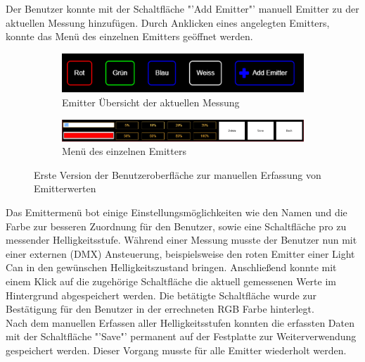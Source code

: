 \documentclass[11pt]{scrartcl}
\begin{document}
Der Benutzer konnte mit der Schaltfläche "'Add Emitter"' manuell Emitter zu der aktuellen Messung hinzufügen. Durch Anklicken eines angelegten
Emitters, konnte das Menü des einzelnen Emitters geöffnet werden.
\begin{figure}[H]
    \centering
    \begin{subfigure}[b]{\textwidth}
        \includegraphics[width=\textwidth]{images/app_emitters_v1.png}
        \caption{Emitter Übersicht der aktuellen Messung}
    \end{subfigure}
    \hfill 
    \begin{subfigure}[b]{\textwidth}
        \includegraphics[width=\textwidth]{images/app_edit_emitters_v1.png}
        \caption{Menü des einzelnen Emitters}
    \end{subfigure}
    \caption{Erste Version der Benutzeroberfläche zur manuellen Erfassung von Emitterwerten}
\end{figure}
\noindent
Das Emittermenü bot einige Einstellungsmöglichkeiten wie den Namen und die Farbe zur besseren Zuordnung für den Benutzer, sowie eine Schaltfläche pro zu messender
Helligkeitsstufe. Während einer Messung musste der Benutzer nun mit einer externen (DMX) Ansteuerung, beispielsweise den roten
Emitter einer Light Can in den gewünschen Helligkeitszustand bringen. Anschließend konnte mit einem Klick auf die zugehörige Schaltfläche die
aktuell gemessenen Werte im Hintergrund abgespeichert werden. Die betätigte Schaltfläche wurde zur Bestätigung für den Benutzer in der errechneten
RGB Farbe hinterlegt.\\
Nach dem manuellen Erfassen aller Helligkeitsstufen konnten die erfassten Daten mit der Schaltfläche "'Save"' permanent auf der Festplatte zur
Weiterverwendung gespeichert werden. Dieser Vorgang musste für alle Emitter wiederholt werden.
\end{document}
